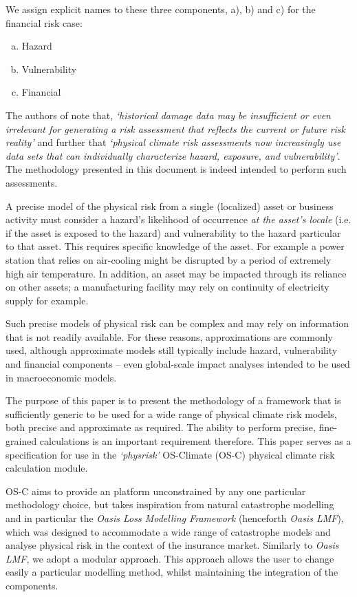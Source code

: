 \documentclass[a4paper,11pt]{extarticle} %
\begin{document}
We assign explicit names to these three components, a), b) and c) for the financial risk case:
\begin{enumerate}[a)]
\item Hazard
\item Vulnerability
\item Financial
\end{enumerate}

The authors of \cite{BavandiEtAl:2022} note that, \emph{`historical damage data may be insufficient or even irrelevant for generating a risk assessment that reflects the current or future risk reality'} and further that \emph{`physical climate risk assessments now increasingly use data sets that can individually characterize hazard, exposure, and vulnerability'}. The methodology presented in this document is indeed intended to perform such assessments.

A precise model of the physical risk from a single (localized) asset or business activity must consider a hazard's likelihood of occurrence \emph{at the asset's locale} (i.e. if the asset is exposed to the hazard) and vulnerability to the hazard particular to that asset. This requires specific knowledge of the asset. For example a power station that relies on air-cooling might be disrupted by a period of extremely high air temperature. In addition, an asset may be impacted through its reliance on other assets; a manufacturing facility may rely on continuity of electricity supply for example.

Such precise models of physical risk can be complex and may rely on information that is not readily available. For these reasons, approximations are commonly used, although approximate models still typically include hazard, vulnerability and financial components \cite{BertramEtAl:2020}\cite{WoetzelEtAl:2020} -- even global-scale impact analyses intended to be used in macroeconomic models.

The purpose of this paper is to present the methodology of a framework that is sufficiently generic to be used for a wide range of physical climate risk models, both precise and approximate as required. The ability to perform precise, fine-grained calculations is an important requirement therefore. This paper serves as a specification for use in the \emph{`physrisk'} OS-Climate (OS-C) \cite{OSC} physical climate risk calculation module.

OS-C aims to provide an platform unconstrained by any one particular methodology choice, but takes inspiration from natural catastrophe modelling \cite{MitchellEtAl:2017} and in particular the \emph{Oasis Loss Modelling Framework} \cite{OasisLMF} (henceforth \emph{Oasis LMF}), which was designed to accommodate a wide range of catastrophe models and analyse physical risk in the context of the insurance market. Similarly to \emph{Oasis LMF}, we adopt a modular approach. This approach allows the user to change easily a particular modelling method, whilst maintaining the integration of the components. 
\end{document}

